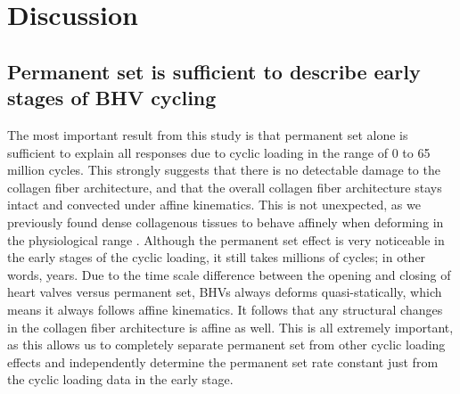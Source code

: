 \section{Discussion}

\subsection{Permanent set is sufficient to describe early stages of BHV cycling}
	The most important result from this study is that permanent set alone is sufficient to explain all responses due to cyclic loading in the range of 0 to 65 million cycles. 
	This strongly suggests that there is no detectable damage to the collagen fiber architecture, and that the overall collagen fiber architecture stays intact and convected under affine kinematics. 
	This is not unexpected, as we previously found dense collagenous tissues to behave affinely when deforming in the physiological range \cite{lee_presence_2015}. 
	Although the permanent set effect is very noticeable in the early stages of the cyclic loading, it still takes millions of cycles; in other words, years. 
	Due to the time scale difference between the opening and closing of heart valves versus permanent set, BHVs always deforms quasi-statically, which means it always follows affine kinematics. 
	It follows that any structural changes in the collagen fiber architecture is affine as well. 
	This is all extremely important, as this allows us to completely separate permanent set from other cyclic loading effects and independently determine the permanent set rate constant just from the cyclic loading data in the early stage. 

